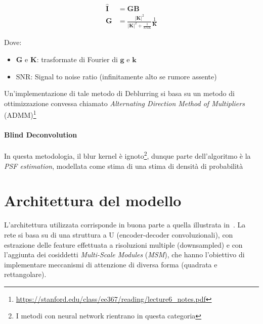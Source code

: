 \documentclass[a4paper,10pt,twocolumn]{article}
\begin{document}
\begin{align}
  \hat{\bm{I}} &= \bm{G}\bm{B} \\
  \bm{G}       &= \frac{|\bm{K}|^2}{|\bm{K}|^2+\frac{1}{\mathrm{SNR}}} \frac{1}{\bm{K}}
\end{align}

Dove:

\begin{itemize}[topsep=0pt, noitemsep]
  \item[] $\bm{G}$ e $\bm{K}$: trasformate di Fourier di $\bm{g}$ e $\bm{k}$
  \item[] $\mathrm{SNR}$: Signal to noise ratio (infinitamente alto se rumore assente)
\end{itemize}

Un'implementazione di tale metodo di Deblurring si basa su un metodo di ottimizzazione convessa chiamato \textit{Alternating Direction Method of Multipliers} (ADMM)\footnote{\url{https://stanford.edu/class/ee367/reading/lecture6_notes.pdf}}

\paragraph*{Blind Deconvolution}

In questa metodologia, il blur kernel \`e ignoto\footnote{I metodi con neural network rientrano in questa categoria}, dunque parte dell'algoritmo \`e la \textit{PSF estimation}, modellata come
stima di una stima di densit\`a di probabilit\`a

\section{Architettura del modello}
L'architettura utilizzata corrisponde in buona parte a quella illustrata in~\cite{convir}. La rete si basa su di una struttura a U (encoder-decoder convoluzionali), con estrazione delle feature effettuata a risoluzioni multiple (downsampled)
e con l'aggiunta dei cosiddetti \textit{Multi-Scale Modules} (\textit{MSM}), che hanno l'obiettivo di implementare meccanismi di attenzione di diversa forma (quadrata e rettangolare).
\end{document}
